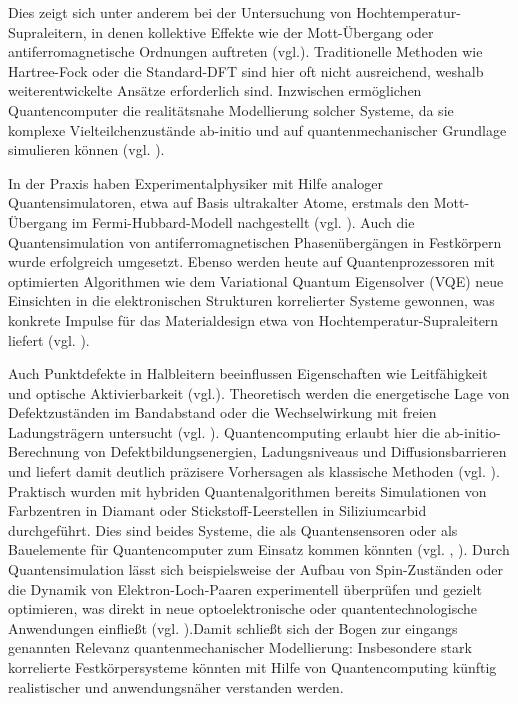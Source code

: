 Dies zeigt sich unter anderem bei der Untersuchung von Hochtemperatur-Supraleitern, in denen kollektive Effekte wie der Mott-Übergang oder antiferromagnetische Ordnungen auftreten (vgl.\cite{daley_practical_2022}). Traditionelle Methoden wie Hartree-Fock oder die Standard-DFT sind hier oft nicht ausreichend, weshalb weiterentwickelte Ansätze erforderlich sind. Inzwischen ermöglichen Quantencomputer die realitätsnahe Modellierung solcher Systeme, da sie komplexe Vielteilchenzustände ab-initio und auf quantenmechanischer Grundlage simulieren können (vgl. \cite{baker_simulating_2024}).

In der Praxis haben Experimentalphysiker mit Hilfe analoger Quantensimulatoren, etwa auf Basis ultrakalter Atome, erstmals den Mott-Übergang im Fermi-Hubbard-Modell nachgestellt (vgl. \cite{daley_practical_2022}). Auch die Quantensimulation von antiferromagnetischen Phasenübergängen in Festkörpern wurde erfolgreich umgesetzt. Ebenso werden heute auf Quantenprozessoren mit optimierten Algorithmen wie dem Variational Quantum Eigensolver (VQE) neue Einsichten in die elektronischen Strukturen korrelierter Systeme gewonnen, was konkrete Impulse für das Materialdesign etwa von Hochtemperatur-Supraleitern liefert (vgl. \cite{weidman_quantum_2024}).

Auch Punktdefekte in Halbleitern beeinflussen Eigenschaften wie Leitfähigkeit und optische Aktivierbarkeit (vgl.\cite{bassett_quantum_2019}). Theoretisch werden die energetische Lage von Defektzuständen im Bandabstand oder die Wechselwirkung mit freien Ladungsträgern untersucht (vgl. \cite{freysoldt_first-principles_2014}). Quantencomputing erlaubt hier die ab-initio-Berechnung von Defektbildungsenergien, Ladungsniveaus und Diffusionsbarrieren und liefert damit deutlich präzisere Vorhersagen als klassische Methoden (vgl. \cite{bassett_quantum_2019}).
Praktisch wurden mit hybriden Quantenalgorithmen bereits Simulationen von Farbzentren in Diamant oder Stickstoff-Leerstellen in Siliziumcarbid durchgeführt. Dies sind beides Systeme, die als Quantensensoren oder als Bauelemente für Quantencomputer zum Einsatz kommen könnten  (vgl. \cite{baker_simulating_2024}, \cite{cao_ab_2023}). Durch Quantensimulation lässt sich beispielsweise der Aufbau von Spin-Zuständen oder die Dynamik von Elektron-Loch-Paaren experimentell überprüfen und gezielt optimieren, was direkt in neue optoelektronische oder quantentechnologische Anwendungen einfließt (vgl. \cite{cao_ab_2023}).Damit schließt sich der Bogen zur eingangs genannten Relevanz quantenmechanischer Modellierung: Insbesondere stark korrelierte Festkörpersysteme könnten mit Hilfe von Quantencomputing künftig realistischer und anwendungsnäher verstanden werden.


